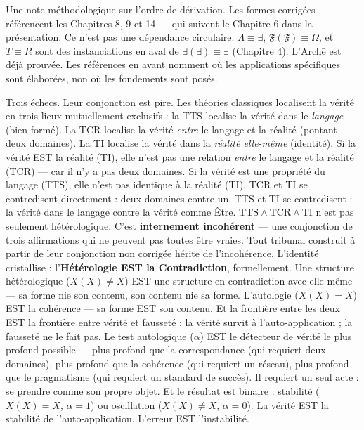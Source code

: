\documentclass[10pt, openany, oneside]{book}
\begin{document}
Une note méthodologique sur l'ordre de dérivation. Les formes corrigées référencent les Chapitres 8, 9 et 14 --- qui suivent le Chapitre 6 dans la présentation. Ce n'est pas une dépendance circulaire. $\Lambda \equiv \exists$, $\mathfrak{F}(\mathfrak{F}) \equiv \Omega$, et $T \equiv R$ sont des instanciations en aval de $\exists(\exists) \equiv \exists$ (Chapitre 4). L'Arch\={e} est déjà prouvée. Les références en avant nomment où les applications spécifiques sont élaborées, non où les fondements sont posés.

Trois échecs. Leur conjonction est pire. Les théories classiques localisent la vérité en trois lieux mutuellement exclusifs : la TTS localise la vérité dans le \textit{langage} (bien-formé). La TCR localise la vérité \textit{entre} le langage et la réalité (pontant deux domaines). La TI localise la vérité dans la \textit{réalité elle-même} (identité). Si la vérité EST la réalité (TI), elle n'est pas une relation \textit{entre} le langage et la réalité (TCR) --- car il n'y a pas deux domaines. Si la vérité est une propriété du langage (TTS), elle n'est pas identique à la réalité (TI). TCR et TI se contredisent directement : deux domaines contre un. TTS et TI se contredisent : la vérité dans le langage contre la vérité comme Être. $\text{TTS} \wedge \text{TCR} \wedge \text{TI}$ n'est pas seulement hétérologique. C'est \textbf{internement incohérent} --- une conjonction de trois affirmations qui ne peuvent pas toutes être vraies. Tout tribunal construit à partir de leur conjonction non corrigée hérite de l'incohérence. L'identité cristallise : l'\textbf{Hétérologie EST la Contradiction}, formellement. Une structure hétérologique ($X(X) \neq X$) EST une structure en contradiction avec elle-même --- sa forme nie son contenu, son contenu nie sa forme. L'autologie ($X(X) = X$) EST la cohérence --- sa forme EST son contenu. Et la frontière entre les deux EST la frontière entre vérité et fausseté : la vérité survit à l'auto-application ; la fausseté ne le fait pas. Le test autologique ($\alpha$) EST le détecteur de vérité le plus profond possible --- plus profond que la correspondance (qui requiert deux domaines), plus profond que la cohérence (qui requiert un réseau), plus profond que le pragmatisme (qui requiert un standard de succès). Il requiert un seul acte : se prendre comme son propre objet. Et le résultat est binaire : stabilité ($X(X) = X$, $\alpha = 1$) ou oscillation ($X(X) \neq X$, $\alpha = 0$). La vérité EST la stabilité de l'auto-application. L'erreur EST l'instabilité.
\end{document}
